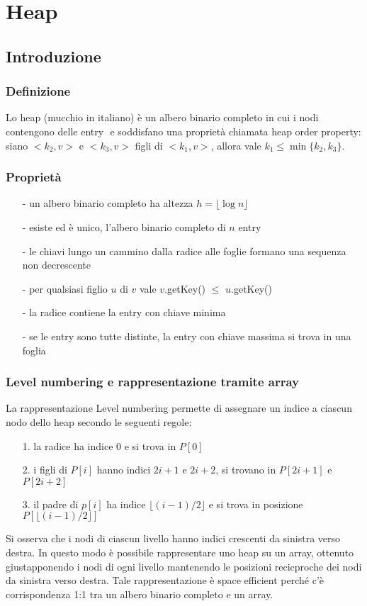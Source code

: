 \documentclass[a4paper]{article}
\begin{document}
\newpage

\section{Heap}
\subsection{Introduzione}
\subsubsection*{Definizione}
Lo heap (mucchio in italiano) è un albero binario completo in cui i nodi contengono delle entry \(<k,v>\) e soddisfano una proprietà
chiamata heap order property: siano \(<k_2,v>\) e \(<k_3,v>\) figli di \(<k_1,v>\), allora vale \(k_1 \leq \min \{k_2, k_3\}\).

\subsubsection*{Proprietà}
\begin{itemize}[topsep=3pt, itemsep=0pt]
	\item[-] un albero binario completo ha altezza \(h = \lfloor \log n \rfloor\)
	\item[-] esiste ed è unico, l'albero binario completo di \(n\) entry
	\item[-] le chiavi lungo un cammino dalla radice alle foglie formano una sequenza non decrescente
	\item[-] per qualsiasi figlio \(u\) di \(v\) vale \(v\).getKey() \(\leq\) \(u\).getKey()
	\item[-] la radice contiene la entry con chiave minima
	\item[-] se le entry sono tutte distinte, la entry con chiave massima si trova in una foglia
\end{itemize}

\subsubsection*{Level numbering e rappresentazione tramite array}
La rappresentazione Level numbering permette di assegnare un indice a ciascun nodo dello heap secondo le seguenti regole:
\begin{itemize}[topsep=3pt, itemsep=0pt]
	\item[1.] la radice ha indice 0 e si trova in \(P[0]\)
	\item[2.] i figli di \(P[i]\) hanno indici \(2i+1\) e \(2i+2\), si trovano in \(P[2i+1]\) e \(P[2i+2]\)
	\item[3.] il padre di \(p[i]\) ha indice \(\lfloor (i-1)/2 \rfloor\) e si trova in posizione \(P[\lfloor (i-1)/2 \rfloor]\)
\end{itemize}
Si osserva che i nodi di ciascun livello hanno indici crescenti da sinistra verso destra. In questo modo è possibile rappresentare
uno heap su un array, ottenuto giustapponendo i nodi di ogni livello mantenendo le posizioni recicproche dei nodi da sinistra verso
destra. Tale rappresentazione è space efficient perché c'è corrispondenza 1:1 tra un albero binario completo e un array.
\end{document}
